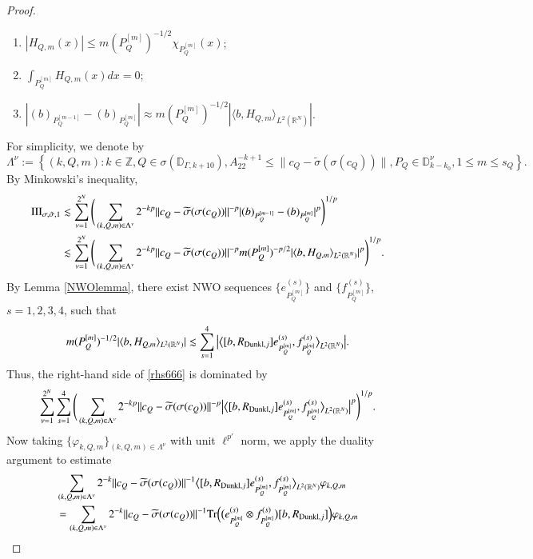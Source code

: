 \documentclass[12pt]{amsart}
\begin{document}
\begin{proof}
\begin{enumerate}
  \item $|H_{Q,m}(x)|\leq m(P_Q^{[m]})^{-1/2}\chi_{P^{[m]}_Q}(x)$;\smallskip
  \item $\int_{P_Q^{[m]}} H_{Q,m}(x)dx=0$;\smallskip
  \item $|(b)_{P_Q^{[m-1]}}-(b)_{P_Q^{[m]}}|\approx m(P_Q^{[m]})^{-1/2}|\langle b,H_{Q,m}\rangle_{L^2(\mathbb{R}^N)}|$.
\end{enumerate}
For simplicity, we denote by
$$\Lambda^\nu:=\left\{(k,Q,m):k\in\mathbb{Z}, Q\in\mathcal{\sigma}(\mathbb{D}_{\Gamma,k+10}),A_22^{-k+1}\leq \|c_Q-\widetilde{\sigma}(\sigma(c_Q))\|,P_Q\in\mathbb{D}_{k-k_0}^\nu,1\leq m\leq s_Q\right\}.$$
By Minkowski's inequality,
\begin{align}\label{rhs666}
{\rm III_{\sigma,\tilde{\sigma},1}}
&\lesssim \sum_{\nu=1}^{2^N}\Bigg(\sum_{(k,Q,m)\in\Lambda^\nu}2^{-kp}\|c_Q-\widetilde{\sigma}(\sigma(c_Q))\|^{-p}|(b)_{P_Q^{[m-1]}}-(b)_{P_Q^{[m]}}|^p\Bigg)^{1/p}\nonumber\\
&\lesssim \sum_{\nu=1}^{2^N}\Bigg(\sum_{(k,Q,m)\in\Lambda^\nu}2^{-kp}\|c_Q-\widetilde{\sigma}(\sigma(c_Q))\|^{-p}m(P_Q^{[m]})^{-p/2}|\langle b,H_{Q,m}\rangle_{L^2(\mathbb{R}^N)}|^p\Bigg)^{1/p}.
\end{align}
By Lemma \ref{NWOlemma}, there exist NWO sequences $\{e_{P_Q^{[m]}}^{(s)}\}$ and $\{f_{P_Q^{[m]}}^{(s)}\}$, $s=1,2,3,4$, such that
\begin{align*}
m(P_Q^{[m]})^{-1/2}|\langle b,H_{Q,m}\rangle_{L^2(\mathbb{R}^N)}|\lesssim \sum_{s=1}^4\big|\big\langle [b,R_{{\rm Dunkl},j}]e_{P_Q^{[m]}}^{(s)},f_{P_Q^{[m]}}^{(s)}\big\rangle_{L^2(\mathbb{R}^N)}\big|.
\end{align*}
Thus, the right-hand side of \eqref{rhs666} is dominated by
$$\sum_{\nu=1}^{2^N}\sum_{s=1}^4\Bigg(\sum_{(k,Q,m)\in\Lambda^\nu}2^{-kp}\|c_Q-\widetilde{\sigma}(\sigma(c_Q))\|^{-p}\big|\big\langle [b,R_{{\rm Dunkl},j}]e_{P_Q^{[m]}}^{(s)},f_{P_Q^{[m]}}^{(s)}\big\rangle_{L^2(\mathbb{R}^N)}\big|^p\Bigg)^{1/p}.$$
Now taking $\{\varphi_{k,Q,m}\}_{(k,Q,m)\in\Lambda^\nu}$ with unit $\ell^{p'}$ norm, we apply the duality argument to estimate
\begin{align}\label{repeatduality}
&\sum_{(k,Q,m)\in\Lambda^\nu}2^{-k}\|c_Q-\widetilde{\sigma}(\sigma(c_Q))\|^{-1}\big\langle [b,R_{\D,j}]e_{P_Q^{[m]}}^{(s)},f_{P_Q^{[m]}}^{(s)}\big\rangle_{L^2(\mathbb{R}^N)}\varphi_{k,Q,m}\nonumber\\
&=\sum_{(k,Q,m)\in\Lambda^\nu}2^{-k}\|c_Q-\widetilde{\sigma}(\sigma(c_Q))\|^{-1}{\rm Tr}\Big(\big(e_{P_Q^{[m]}}^{(s)}\otimes f_{P_Q^{[m]}}^{(s)}\big)[b,R_{\D,j}]\Big)\varphi_{k,Q,m}\nonumber\\

\end{align}
\end{proof}
\end{document}
